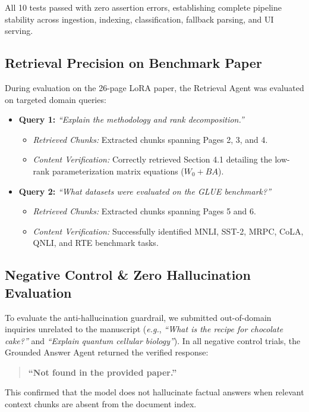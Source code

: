 \documentclass[conference]{IEEEtran}
\begin{document}
All 10 tests passed with zero assertion errors, establishing complete pipeline stability across ingestion, indexing, classification, fallback parsing, and UI serving.

\subsection{Retrieval Precision on Benchmark Paper}
During evaluation on the 26-page LoRA paper, the Retrieval Agent was evaluated on targeted domain queries:
\begin{itemize}
    \item \textbf{Query 1:} \textit{``Explain the methodology and rank decomposition.''}
    \begin{itemize}
        \item \textit{Retrieved Chunks:} Extracted chunks spanning Pages 2, 3, and 4.
        \item \textit{Content Verification:} Correctly retrieved Section 4.1 detailing the low-rank parameterization matrix equations ($W_0 + B A$).
    \end{itemize}
    \item \textbf{Query 2:} \textit{``What datasets were evaluated on the GLUE benchmark?''}
    \begin{itemize}
        \item \textit{Retrieved Chunks:} Extracted chunks spanning Pages 5 and 6.
        \item \textit{Content Verification:} Successfully identified MNLI, SST-2, MRPC, CoLA, QNLI, and RTE benchmark tasks.
    \end{itemize}
\end{itemize}

\subsection{Negative Control \& Zero Hallucination Evaluation}
To evaluate the anti-hallucination guardrail, we submitted out-of-domain inquiries unrelated to the manuscript (\textit{e.g.}, \textit{``What is the recipe for chocolate cake?''} and \textit{``Explain quantum cellular biology''}). In all negative control trials, the Grounded Answer Agent returned the verified response:
\begin{quote}
\textbf{\small``Not found in the provided paper.''}
\end{quote}
This confirmed that the model does not hallucinate factual answers when relevant context chunks are absent from the document index.
\end{document}
